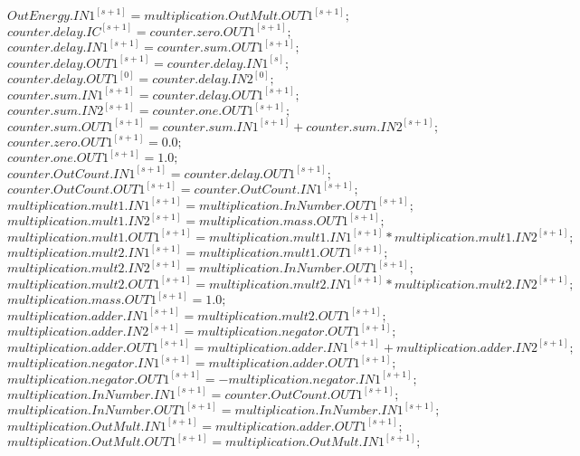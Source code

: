 \documentclass{article}
\begin{document}
\(OutEnergy.IN1^{[s+1]} = multiplication.OutMult.OUT1^{[s+1]};\)\\
\(counter.delay.IC^{[s+1]} = counter.zero.OUT1^{[s+1]};\)\\
\(counter.delay.IN1^{[s+1]} = counter.sum.OUT1^{[s+1]};\)\\
\(counter.delay.OUT1^{[s+1]} = counter.delay.IN1^{[s]};\)\\
\(counter.delay.OUT1^{[0]} = counter.delay.IN2^{[0]};\)\\
\(counter.sum.IN1^{[s+1]} = counter.delay.OUT1^{[s+1]};\)\\
\(counter.sum.IN2^{[s+1]} = counter.one.OUT1^{[s+1]};\)\\
\(counter.sum.OUT1^{[s+1]} = counter.sum.IN1^{[s+1]} + counter.sum.IN2^{[s+1]};\)\\
\(counter.zero.OUT1^{[s+1]} = 0.0;\)\\
\(counter.one.OUT1^{[s+1]} = 1.0;\)\\
\(counter.OutCount.IN1^{[s+1]} = counter.delay.OUT1^{[s+1]};\)\\
\(counter.OutCount.OUT1^{[s+1]} = counter.OutCount.IN1^{[s+1]};\)\\
\(multiplication.mult1.IN1^{[s+1]} = multiplication.InNumber.OUT1^{[s+1]};\)\\
\(multiplication.mult1.IN2^{[s+1]} = multiplication.mass.OUT1^{[s+1]};\)\\
\(multiplication.mult1.OUT1^{[s+1]} = multiplication.mult1.IN1^{[s+1]} * multiplication.mult1.IN2^{[s+1]};\)\\
\(multiplication.mult2.IN1^{[s+1]} = multiplication.mult1.OUT1^{[s+1]};\)\\
\(multiplication.mult2.IN2^{[s+1]} = multiplication.InNumber.OUT1^{[s+1]};\)\\
\(multiplication.mult2.OUT1^{[s+1]} = multiplication.mult2.IN1^{[s+1]} * multiplication.mult2.IN2^{[s+1]};\)\\
\(multiplication.mass.OUT1^{[s+1]} = 1.0;\)\\
\(multiplication.adder.IN1^{[s+1]} = multiplication.mult2.OUT1^{[s+1]};\)\\
\(multiplication.adder.IN2^{[s+1]} = multiplication.negator.OUT1^{[s+1]};\)\\
\(multiplication.adder.OUT1^{[s+1]} = multiplication.adder.IN1^{[s+1]} + multiplication.adder.IN2^{[s+1]};\)\\
\(multiplication.negator.IN1^{[s+1]} = multiplication.adder.OUT1^{[s+1]};\)\\
\(multiplication.negator.OUT1^{[s+1]} = -multiplication.negator.IN1^{[s+1]};\)\\
\(multiplication.InNumber.IN1^{[s+1]} = counter.OutCount.OUT1^{[s+1]};\)\\
\(multiplication.InNumber.OUT1^{[s+1]} = multiplication.InNumber.IN1^{[s+1]};\)\\
\(multiplication.OutMult.IN1^{[s+1]} = multiplication.adder.OUT1^{[s+1]};\)\\
\(multiplication.OutMult.OUT1^{[s+1]} = multiplication.OutMult.IN1^{[s+1]};\)\\
\end{document}
